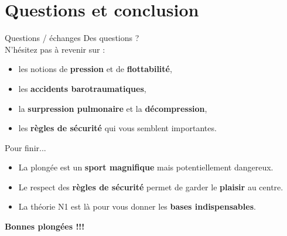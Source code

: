 \section{Questions et conclusion}

\begin{frame}{Questions / échanges}
  \centering
  \Large
  Des questions ?\\[0.5cm]
  \normalsize
  N’hésitez pas à revenir sur :
  \begin{itemize}
    \item les notions de \textbf{pression} et de \textbf{flottabilité},
    \item les \textbf{accidents barotraumatiques},
    \item la \textbf{surpression pulmonaire} et la \textbf{décompression},
    \item les \textbf{règles de sécurité} qui vous semblent importantes.
  \end{itemize}
\end{frame}

\begin{frame}{Pour finir...}
  \begin{itemize}
    \item La plongée est un \textbf{sport magnifique} mais potentiellement dangereux.
    \item Le respect des \textbf{règles de sécurité} permet de garder le \textbf{plaisir} au centre.
    \item La théorie N1 est là pour vous donner les \textbf{bases indispensables}.
  \end{itemize}

  \vfill
  \centering
  \Large
  \textbf{Bonnes plongées !!!}
\end{frame}
